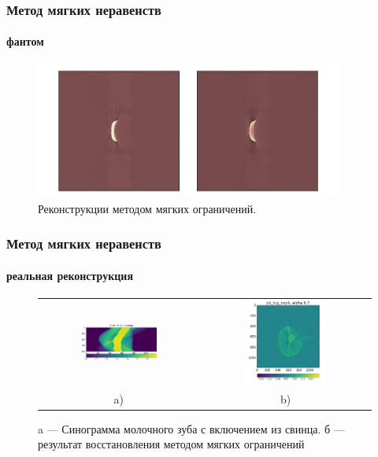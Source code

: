 \documentclass[12pt]{beamer}
\begin{document}
\begin{frame}
\frametitle{Метод мягких неравенств}
\framesubtitle{фантом}

\begin{figure}
  \centering
  \includegraphics[width=0.9\textwidth]{../Dissertation/images/part2_img/sample}
  \caption{Реконструкции методом мягких ограничений.}
  \label{fig:sample}
\end{figure}

\end{frame}

\begin{frame}
\frametitle{Метод мягких неравенств}
\framesubtitle{реальная реконструкция}

\begin{figure}
\centering
\vspace{-0.6cm}
\begin{tabular}{@{}c@{}c}
    \includegraphics[width=0.50\textwidth]{../Dissertation/images/part2_img/tooth_sino}
&
    \includegraphics[width=0.50\textwidth]{../Dissertation/images/part2_img/soft_ineq_pb_tooth}
\\
   \small a) & \small b)
\end{tabular}
  \caption{a --- Синограмма молочного зуба с включением из свинца. б --- результат восстановления методом мягких ограничений}
\label{fig:tooth_sino_rec}
\end{figure}

\end{frame}
\end{document}
